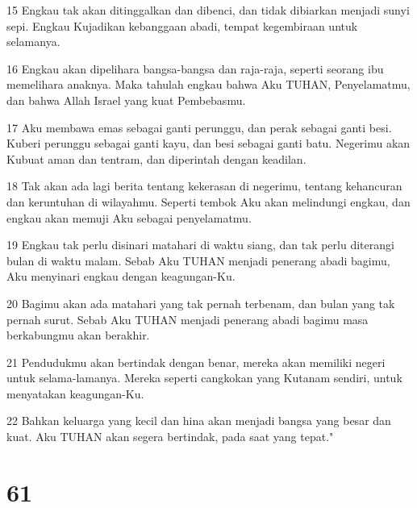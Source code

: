 \par 15 Engkau tak akan ditinggalkan dan dibenci, dan tidak dibiarkan menjadi sunyi sepi. Engkau Kujadikan kebanggaan abadi, tempat kegembiraan untuk selamanya.
\par 16 Engkau akan dipelihara bangsa-bangsa dan raja-raja, seperti seorang ibu memelihara anaknya. Maka tahulah engkau bahwa Aku TUHAN, Penyelamatmu, dan bahwa Allah Israel yang kuat Pembebasmu.
\par 17 Aku membawa emas sebagai ganti perunggu, dan perak sebagai ganti besi. Kuberi perunggu sebagai ganti kayu, dan besi sebagai ganti batu. Negerimu akan Kubuat aman dan tentram, dan diperintah dengan keadilan.
\par 18 Tak akan ada lagi berita tentang kekerasan di negerimu, tentang kehancuran dan keruntuhan di wilayahmu. Seperti tembok Aku akan melindungi engkau, dan engkau akan memuji Aku sebagai penyelamatmu.
\par 19 Engkau tak perlu disinari matahari di waktu siang, dan tak perlu diterangi bulan di waktu malam. Sebab Aku TUHAN menjadi penerang abadi bagimu, Aku menyinari engkau dengan keagungan-Ku.
\par 20 Bagimu akan ada matahari yang tak pernah terbenam, dan bulan yang tak pernah surut. Sebab Aku TUHAN menjadi penerang abadi bagimu masa berkabungmu akan berakhir.
\par 21 Pendudukmu akan bertindak dengan benar, mereka akan memiliki negeri untuk selama-lamanya. Mereka seperti cangkokan yang Kutanam sendiri, untuk menyatakan keagungan-Ku.
\par 22 Bahkan keluarga yang kecil dan hina akan menjadi bangsa yang besar dan kuat. Aku TUHAN akan segera bertindak, pada saat yang tepat."

\chapter{61}


